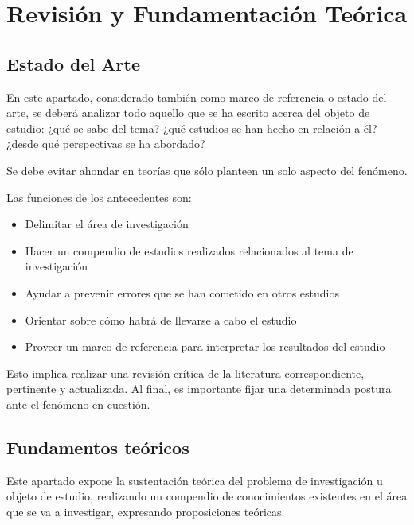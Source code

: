 \chapter{Revisión y Fundamentación Teórica}

\section{Estado del Arte}
En este apartado, considerado también como marco de referencia o estado del arte, se deberá analizar todo aquello que se ha escrito acerca del objeto de estudio: ¿qué se sabe del tema? ¿qué estudios se han hecho en relación a él? ¿desde qué perspectivas se ha abordado?\newline

Se debe evitar ahondar en teorías que sólo planteen un solo aspecto del fenómeno.\newline

Las funciones de los antecedentes son:

\begin{itemize}
    \item Delimitar el área de investigación
    \item Hacer un compendio de estudios realizados relacionados al tema de investigación
    \item Ayudar a prevenir errores que se han cometido en otros estudios
    \item Orientar sobre cómo habrá de llevarse a cabo el estudio
    \item Proveer un marco de referencia para interpretar los resultados del estudio
\end{itemize}

Esto implica realizar una revisión crítica de la literatura correspondiente, pertinente y actualizada. Al final, es importante fijar una determinada postura ante el fenómeno en cuestión.

\section{Fundamentos teóricos}

Este apartado expone la sustentación teórica del problema de investigación u objeto de estudio, realizando un compendio de conocimientos existentes en el área que se va a investigar, expresando proposiciones teóricas.
